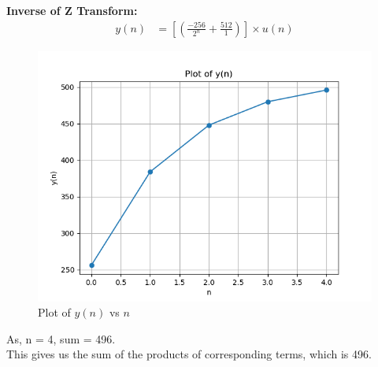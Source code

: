\documentclass[journal,12pt,twocolumn]{IEEEtran}
\theoremstyle{remark}
\begin{document}
\textbf{Inverse of Z Transform:} \\
\begin{align}
y(n) &= \left[(\frac{-256}{2^{n}} + \frac{512}{1})\right] \times u(n)
\end{align}
\begin{figure}[h!]
    \centering
    \includegraphics[width=\columnwidth]{figs/yn.png}
    \caption{Plot of $y(n)$ vs $n$}
    \label{fig:1}
\end{figure}
As, n = 4, sum = 496. \\
This gives us the sum of the products of corresponding terms, which is 496.
\end{document}
